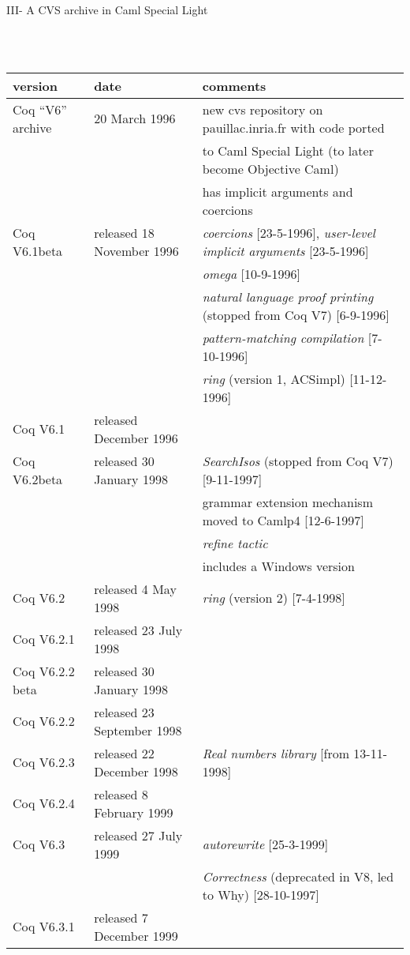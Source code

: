 \documentclass[a4paper]{book}
\newcommand{\feature}[1]{{\em #1}}
\begin{document}
\centerline{III- A CVS archive in Caml Special Light}
\mbox{}\\
\mbox{}\\
\begin{tabular}{l|l|l}
version & date & comments \\
\hline
Coq ``V6'' archive & 20 March 1996 & new cvs repository on pauillac.inria.fr with code ported \\
 & & to Caml Special Light (to later become Objective Caml)\\
 & & has implicit arguments and coercions\\

Coq V6.1beta& released 18 November 1996 & \feature{coercions} [23-5-1996], \feature{user-level implicit arguments} [23-5-1996]\\
 & & \feature{omega} [10-9-1996] \\
 & & \feature{natural language proof printing} (stopped from Coq V7) [6-9-1996]\\
 & & \feature{pattern-matching compilation} [7-10-1996]\\
 & & \feature{ring} (version 1, ACSimpl) [11-12-1996]\\

Coq V6.1& released December 1996 & \\

Coq V6.2beta& released 30 January 1998 & %
      \feature{SearchIsos} (stopped from Coq V7) [9-11-1997]\\
  & & grammar extension mechanism moved to Camlp4 [12-6-1997]\\
  & & \feature{refine tactic}\\
  & & includes a Windows version\\

Coq V6.2& released 4 May 1998 & %
  \feature{ring} (version 2) [7-4-1998] \\

Coq V6.2.1& released 23 July 1998\\

Coq V6.2.2 beta& released 30 January 1998\\

Coq V6.2.2& released 23 September 1998\\

Coq V6.2.3& released 22 December 1998 & \feature{Real numbers library} [from 13-11-1998] \\

Coq V6.2.4& released 8 February 1999\\

Coq V6.3& released 27 July 1999 & \feature{autorewrite} [25-3-1999]\\
 & & \feature{Correctness} (deprecated in V8, led to Why) [28-10-1997]\\

Coq V6.3.1& released 7 December 1999\\
\end{tabular}
\medskip
\bigskip
\end{document}
